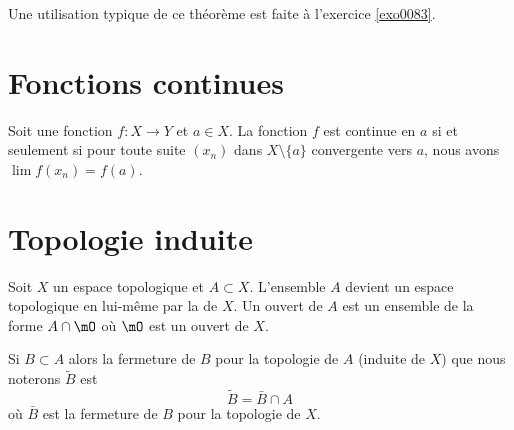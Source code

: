 Une utilisation typique de ce théorème est faite à l'exercice \ref{exo0083}.

\section{Fonctions continues}

\begin{proposition}		\label{PropFnContParSuite}
	Soit une fonction $f\colon X\to Y$ et $a\in X$. La fonction $f$ est continue en $a$ si et seulement si pour toute suite $(x_n)$ dans $X\setminus\{ a \}$ convergente vers $a$, nous avons $\lim f(x_n)=f(a)$.
\end{proposition}

\section{Topologie induite}

Soit \( X\) un espace topologique et \( A\subset X\). L'ensemble \( A\) devient un espace topologique en lui-même par la  de \( X\). Un ouvert de \( A\) est un ensemble de la forme \( A\cap\mO\) où \( \mO\) est un ouvert de \( X\).

\begin{lemma}       \label{LemkUYkQt}
    Si \( B\subset A\) alors la fermeture de \( B\) pour la topologie de \( A\) (induite de \( X\)) que nous noterons \( \tilde B\) est 
    \begin{equation}
        \tilde B=\bar B\cap A
    \end{equation}
    où \( \bar B\) est la fermeture de \( B\) pour la topologie de \( X\).
\end{lemma}

